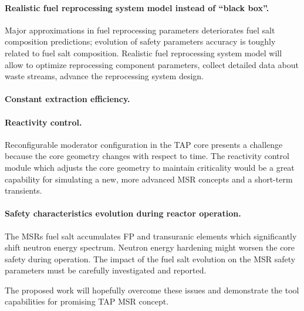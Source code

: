 \paragraph{Realistic fuel reprocessing system model instead of ``black box''.} 
Major approximations in fuel reprocessing parameters deteriorates fuel salt 
composition predictions; evolution of safety parameters accuracy is toughly 
related to fuel salt composition. Realistic fuel reprocessing system model will 
allow to optimize reprocessing component parameters, collect detailed data about 
waste streams, advance the reprocessing system design.
\paragraph{Constant extraction efficiency.}
\paragraph{Reactivity control.} Reconfigurable moderator configuration in the 
\gls{TAP} core presents a challenge because the core geometry changes with 
respect to time. The reactivity control module which adjusts the core geometry 
to maintain criticality would be a great capability for simulating a new, more 
advanced \gls{MSR} concepts and a short-term transients.
\paragraph{Safety characteristics evolution during reactor operation.} The 
\glspl{MSR} fuel salt  accumulates \gls{FP} and transuranic elements which 
significantly shift neutron energy spectrum. Neutron energy hardening might 
worsen the core safety during operation. The impact of the fuel salt evolution 
on the \gls{MSR} safety parameters must be carefully investigated and reported.

The proposed work will hopefully overcome these issues and demonstrate the tool 
capabilities for promising \gls{TAP} \gls{MSR} concept.